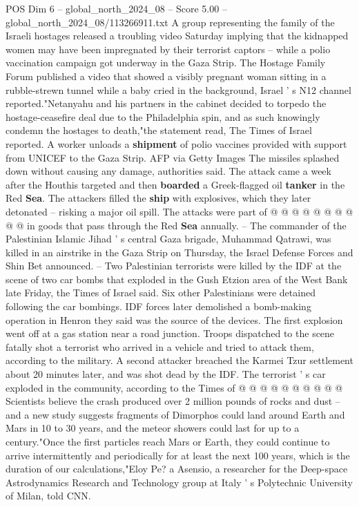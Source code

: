 \begin{textsample}{POS Dim 6 – global\_north\_2024\_08 – Score 5.00 – global\_north\_2024\_08/113266911.txt}  \label{ex:f6_pos_297}
A group representing the family of the Israeli hostages released a troubling video Saturday implying that the kidnapped women may have been impregnated by their terrorist captors -- while a polio vaccination campaign got underway in the Gaza Strip.
The Hostage Family Forum published a video that showed a visibly pregnant woman sitting in a rubble-strewn tunnel while a baby cried in the background, Israel ' s N12 channel reported."Netanyahu and his partners in the cabinet decided to torpedo the hostage-ceasefire deal due to the Philadelphia spin, and as such knowingly condemn the hostages to death,"the statement read, The Times of Israel reported.
A worker unloads a \textbf{shipment} of polio vaccines provided with support from UNICEF to the Gaza Strip.
AFP via Getty Images The missiles splashed down without causing any damage, authorities said.
The attack came a week after the Houthis targeted and then \textbf{boarded} a Greek-flagged oil \textbf{tanker} in the Red \textbf{Sea}.
The attackers filled the \textbf{ship} with explosives, which they later detonated -- risking a major oil spill.
The attacks were part of @ @ @ @ @ @ @ @ @ @ in goods that pass through the Red \textbf{Sea} annually. -- The commander of the Palestinian Islamic Jihad ' s central Gaza brigade, Muhammad Qatrawi, was killed in an airstrike in the Gaza Strip on Thursday, the Israel Defense Forces and Shin Bet announced. -- Two Palestinian terrorists were killed by the IDF at the scene of two car bombs that exploded in the Gush Etzion area of the West Bank late Friday, the Times of Israel said.
Six other Palestinians were detained following the car bombings.
IDF forces later demolished a bomb-making operation in Henron they said was the source of the devices.
The first explosion went off at a gas station near a road junction.
Troops dispatched to the scene fatally shot a terrorist who arrived in a vehicle and tried to attack them, according to the military.
A second attacker breached the Karmei Tzur settlement about 20 minutes later, and was shot dead by the IDF.
The terrorist ' s car exploded in the community, according to the Times of @ @ @ @ @ @ @ @ @ @ Scientists believe the crash produced over 2 million pounds of rocks and dust -- and a new study suggests fragments of Dimorphos could land around Earth and Mars in 10 to 30 years, and the meteor showers could last for up to a century."Once the first particles reach Mars or Earth, they could continue to arrive intermittently and periodically for at least the next 100 years, which is the duration of our calculations,"Eloy Pe? a Asensio, a researcher for the Deep-space Astrodynamics Research and Technology group at Italy ' s Polytechnic University of Milan, told CNN.

\end{textsample}
